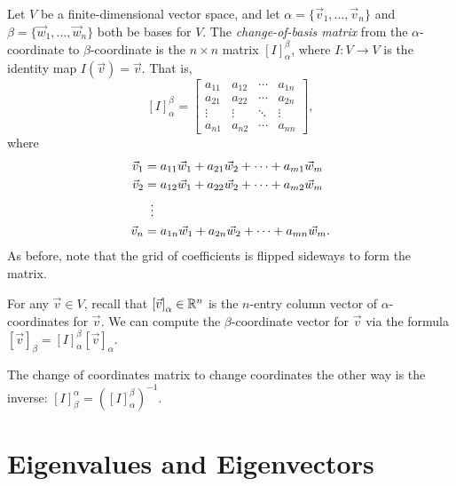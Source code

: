 \begin{definition}
	Let $V$ be a finite-dimensional vector space, and let $\alpha = \{\vec{v}_1,
	\dots, \vec{v}_n\}$ and $\beta = \{\vec{w}_1, \dots, \vec{w}_n\}$ both be
	bases for $V$. The \emph{change-of-basis matrix} from the $\alpha$-coordinate
	to $\beta$-coordinate is the $n \times n$ matrix ${[I]}_\alpha^\beta$, where
	$I: V \rightarrow V$ is the identity map $I(\vec{v}) = \vec{v}$. That is,
	\[
		{[I]}_\alpha^\beta =
		\begin{bmatrix}
			a_{11} & a_{12} & \cdots & a_{1n} \\
			a_{21} & a_{22} & \cdots & a_{2n} \\
			\vdots & \vdots & \ddots & \vdots \\
			a_{n1} & a_{n2} & \cdots & a_{nn}
		\end{bmatrix},
	\]
	where
	\begin{align*}
		\vec{v}_1 &= a_{11} \vec{w}_1 + a_{21} \vec{w}_2 + \cdots + a_{m1} \vec{w}_m
		\\
		\vec{v}_2 &= a_{12} \vec{w}_1 + a_{22} \vec{w}_2 + \cdots + a_{m2} \vec{w}_m
		\\
		&\vdotswithin{=} \\
		\vec{v}_n &= a_{1n} \vec{w}_1 + a_{2n} \vec{w}_2 + \cdots + a_{mn}
		\vec{w}_m.
	\end{align*}
	As before, note that the grid of coefficients is flipped sideways to form the
	matrix.
\end{definition}

\begin{fact}
	For any $\vec{v} \in V$, recall that ${[\vec{v}]}_\alpha \in {\mathbb{R}}^n$ is the
	$n$-entry column vector of $\alpha$-coordinates for $\vec{v}$. We can compute
	the $\beta$-coordinate vector for $\vec{v}$ via the formula ${[\vec{v}]}_\beta
	= {[I]}_\alpha^\beta {[\vec{v}]}_\alpha$.
\end{fact}

\begin{fact}
	The change of coordinates matrix to change coordinates the other way is the
	inverse: ${[I]}_\beta^\alpha = {({[I]}_\alpha^\beta)}^{-1}$.
\end{fact}

\section*{Eigenvalues and Eigenvectors}

